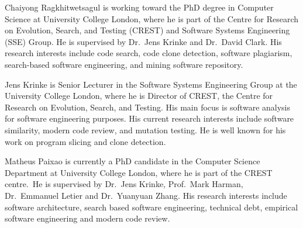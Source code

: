 \documentclass[10pt,journal,compsoc]{IEEEtran}
\begin{document}
\begin{IEEEbiography}{Chaiyong Ragkhitwetsagul}
is working toward the PhD degree in Computer Science at University College London, where he is part of the Centre for Research on Evolution, Search, and Testing (CREST) and Software Systems Engineering (SSE) Group. He is supervised by Dr.~Jens Krinke and Dr.~David Clark. His research interests include code search, code clone detection, software plagiarism, search-based software engineering, and mining software repository.
\end{IEEEbiography}
\vspace{-1cm}

\begin{IEEEbiography}{Jens Krinke}
is Senior Lecturer in the Software Systems Engineering
Group at the University College London, where he is Director of CREST,
the Centre for Research on Evolution, Search, and Testing.  His main
focus is software analysis for software engineering purposes. His
current research interests include software
similarity, modern code review, and mutation testing.  He is well known for his work on
program slicing and clone detection.
\end{IEEEbiography}
\vspace{-1cm}

\begin{IEEEbiography}{Matheus Paixao}
is currently a PhD candidate in the Computer Science Department at University College London, where he is part of the CREST centre.~He is supervised by Dr.~Jens Krinke, Prof.~Mark Harman, Dr.~Emmanuel Letier and Dr.~Yuanyuan Zhang.
His research interests include software architecture, search based software engineering, technical debt, empirical software engineering and modern code review.
\end{IEEEbiography}
\vspace{-1cm}
\end{document}
